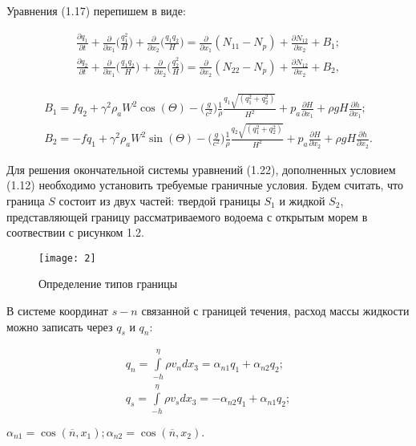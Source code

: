 \documentclass[14pt]{extreport}
\begin{document}
Уравнения (1.17) перепишем в виде:


\begin{eqnarray} 
\frac{\partial q_1}{\partial t} + \frac{\partial}{\partial x_1} \bigg(\frac{q_1^2}{H}\bigg)+\frac{\partial }{\partial x_2}\bigg(\frac{q_1 q_2}{H}\bigg) = \frac{\partial}{\partial x_1} (N_{11}-N_p) + \frac{\partial N_{12}}{\partial x_2} + B_1; \nonumber\\
\frac{\partial q_2}{\partial t} + \frac{\partial}{\partial x_1} \bigg(\frac{q_1 q_2}{H}\bigg)+\frac{\partial }{\partial x_2}\bigg(\frac{q_2^2}{H}\bigg) = \frac{\partial}{\partial x_2} (N_{22}-N_p) + \frac{\partial N_{12}}{\partial x_2} + B_2,
\end{eqnarray}


\begin{eqnarray}
B_1=fq_2+\gamma^2\rho_aW^2\cos(\Theta)-\bigg(\frac{g}{c^2}\bigg)\frac{1}{\rho}\frac{q_1\sqrt{(q_1^2+q_2^2)}}{H^2} + p_a \frac{\partial H}{\partial x_1} + \rho gH\frac{\partial h}{\partial x_1}; \nonumber\\
B_2=-fq_1+\gamma^2\rho_aW^2\sin(\Theta)-\bigg(\frac{g}{c^2}\bigg)\frac{1}{\rho}\frac{q_2\sqrt{(q_1^2+q_2^2)}}{H^2} + p_a \frac{\partial H}{\partial x_2} + \rho gH\frac{\partial h}{\partial x_2}.
\end{eqnarray}

Для решения окончательной системы уравнений (1.22), дополненных условием (1.12) необходимо установить требуемые граничные условия. Будем считать, что граница $S$ состоит из двух частей: твердой границы $S_1$ и жидкой $S_2$, представляющей границу рассматриваемого водоема с открытым морем в соотвествии с рисунком 1.2.

\begin{figure}[H]
\centerline{\texttt{[image: 2]}}
\caption{Определение типов границы}
\label{fig11}
\end{figure}

В системе координат $s-n$ связанной с границей течения, расход массы жидкости можно записать через $q_s$ и $q_n$:

\begin{eqnarray}
q_n=\int\limits^\eta_{-h} \rho v_n dx_3= \alpha_{n1}q_1+\alpha_{n2}q_2; \nonumber\\
q_s=\int\limits^\eta_{-h} \rho v_s dx_3= -\alpha_{n2}q_1+\alpha_{n1}q_2;
\end{eqnarray}

 $\alpha_{n1}=\cos(\overline{n},x_1); \alpha_{n2}=\cos(\overline{n},x_2).$
\end{document}
